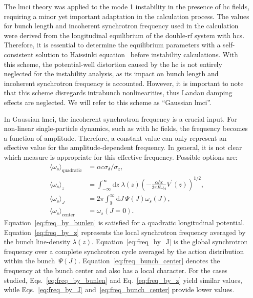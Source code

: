 \documentclass[a4paper,
               ]{jacow}
\begin{document}
The \gls{lmci} theory was applied to the mode 1 instability in the presence of \gls{hc} fields, requiring a minor yet important adaptation in the calculation process. The values for bunch length and incoherent synchrotron frequency used in the calculation were derived from the longitudinal equilibrium of the double-rf system with \glspl{hc}. Therefore, it is essential to determine the equilibrium parameters with a self-consistent solution to Haissinki equation~\cite{AlvesSa2023} before instability calculations. With this scheme, the potential-well distortion caused by the \gls{hc} is not entirely neglected for the instability analysis, as its impact on bunch length and incoherent synchrotron frequency is accounted. However, it is important to note that this scheme disregards intrabunch nonlinearities, thus Landau damping effects are neglected. We will refer to this scheme as ``Gaussian \gls{lmci}''.

In Gaussian \gls{lmci}, the incoherent synchrotron frequency is a crucial input. For non-linear single-particle dynamics, such as with \gls{hc} fields, the frequency becomes a function of amplitude. Therefore, a constant value can only represent an effective value for the amplitude-dependent frequency. In general, it is not clear which measure is appropriate for this effective frequency. Possible options are:
\begin{subequations}
\begin{align}
    \langle\omega_s\rangle_\mathrm{quadratic} &= \alpha c \sigma_\delta / \sigma_z,\label{eq:freq_by_bunlen} \\
    \langle \omega_s \rangle_z &= \int_{-\infty}^{\infty}\mathrm{d}z~\lambda(z) \left(-\frac{\alpha hc}{2\pi E\omega_\mathrm{rf}} V^{\prime}(z)\right)^{1/2}, \label{eq:freq_by_z}\\
    \langle \omega_s \rangle_J &= 2\pi \int_{0}^{\infty}\mathrm{d}J~\Psi(J) \omega_s(J), \label{eq:freq_by_J} \\
    \langle\omega_s\rangle_\mathrm{center} &= \omega_s(J=0).\label{eq:freq_bunch_center}
\end{align}
\end{subequations}Equation~\eqref{eq:freq_by_bunlen} is satisfied for a quadratic longitudinal potential. Equation~\eqref{eq:freq_by_z} represents the local synchrotron frequency averaged by the bunch line-density $\lambda(z)$. Equation~\eqref{eq:freq_by_J} is the global synchrotron frequency over a complete synchrotron cycle averaged by the action distribution within the bunch~$\Psi(J)$. Equation~\eqref{eq:freq_bunch_center} denotes the frequency at the bunch center and also has a local character. For the cases studied, Eqs.~\eqref{eq:freq_by_bunlen} and Eq.~\eqref{eq:freq_by_z} yield similar values, while Eqs.~\eqref{eq:freq_by_J} and~\eqref{eq:freq_bunch_center} provide lower values.
\end{document}

